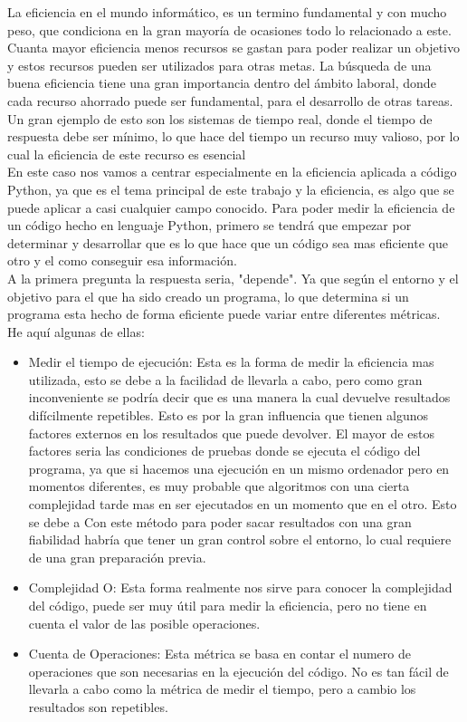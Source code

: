 
La eficiencia en el mundo informático, es un termino fundamental y con mucho peso, que condiciona en la gran mayoría de ocasiones todo lo relacionado a este. Cuanta mayor eficiencia menos recursos se gastan para poder realizar un objetivo y estos recursos pueden ser utilizados para otras metas. 
La búsqueda de una buena eficiencia tiene una gran importancia dentro del ámbito laboral, donde cada recurso ahorrado puede ser fundamental, para el desarrollo de otras tareas. Un gran ejemplo de esto son los sistemas de tiempo real, donde el tiempo de respuesta debe ser mínimo, lo que hace del tiempo un recurso muy valioso, por lo cual la eficiencia de este recurso es esencial\\

En este caso nos vamos a centrar especialmente en la eficiencia aplicada a código Python, ya que es el tema principal de este trabajo y la eficiencia, es algo que se puede aplicar a casi cualquier campo conocido.
Para poder medir la eficiencia de un código hecho en lenguaje Python, primero se tendrá que empezar por determinar y desarrollar que es lo que hace que un código sea mas eficiente que otro y el como conseguir esa información.\\

A la primera pregunta la respuesta seria, "depende". Ya que según el entorno y el objetivo para el que ha sido creado un programa, lo que determina si un programa esta hecho de forma eficiente puede variar entre diferentes métricas.\\ 

He aquí algunas de ellas:
\begin{itemize}
	\item Medir el tiempo de ejecución: Esta es la forma de medir la eficiencia mas utilizada, esto se debe a la facilidad de llevarla a cabo, pero como gran inconveniente se podría decir que es una manera la cual devuelve resultados difícilmente repetibles. Esto es por la gran influencia que tienen algunos factores externos en los resultados que puede devolver. El mayor de estos factores seria las condiciones  de pruebas donde se ejecuta el código del programa, ya que si hacemos una ejecución en un mismo ordenador pero en momentos diferentes, es muy probable que algoritmos con una cierta complejidad tarde mas en ser ejecutados en un momento que en el otro. Esto se debe a Con este método para poder sacar resultados con una gran fiabilidad habría que tener un gran control sobre el entorno, lo cual requiere de una gran preparación previa.
	\item Complejidad O: Esta forma realmente nos sirve para conocer la complejidad del código, puede ser muy útil para medir la eficiencia, pero no tiene en cuenta el valor de las posible operaciones.
	
	\item Cuenta de Operaciones: Esta métrica se basa en contar el numero de operaciones que son necesarias en la ejecución del código. No es tan fácil de llevarla a cabo como la métrica de medir el tiempo, pero a cambio los resultados son repetibles.

\end{itemize}

